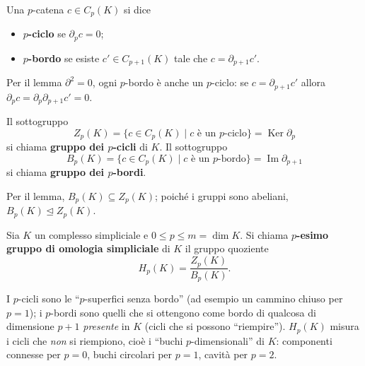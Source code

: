 \begin{definicion}
Una $p$-catena $c \in C_p(K)$ si dice
\begin{itemize}
    \item \textbf{$p$-ciclo} se $\partial_p c = 0$;
    \item \textbf{$p$-bordo} se esiste $c' \in C_{p+1}(K)$ tale che $c = \partial_{p+1} c'$.
\end{itemize}
\end{definicion}

\begin{observacion}
Per il lemma $\partial^2 = 0$, ogni $p$-bordo \`e anche un $p$-ciclo: se $c = \partial_{p+1} c'$ allora $\partial_p c = \partial_p \partial_{p+1} c' = 0$.
\end{observacion}

\begin{definicion}
Il sottogruppo
\[
Z_p(K) = \{ c \in C_p(K) \mid c \text{ \`e un $p$-ciclo} \} = \operatorname{Ker} \partial_p
\]
si chiama \textbf{gruppo dei $p$-cicli} di $K$. Il sottogruppo
\[
B_p(K) = \{ c \in C_p(K) \mid c \text{ \`e un $p$-bordo} \} = \operatorname{Im} \partial_{p+1}
\]
si chiama \textbf{gruppo dei $p$-bordi}.
\end{definicion}

\begin{observacion}
Per il lemma, $B_p(K) \subseteq Z_p(K)$; poich\'e i gruppi sono abeliani, $B_p(K) \trianglelefteq Z_p(K)$.
\end{observacion}

\begin{definicion}
Sia $K$ un complesso simpliciale e $0 \leqslant p \leqslant m = \dim K$. Si chiama \textbf{$p$-esimo gruppo di omologia simpliciale} di $K$ il gruppo quoziente
\[
H_p(K) = \frac{Z_p(K)}{B_p(K)} .
\]
\end{definicion}

\begin{intuizione}
I $p$-cicli sono le ``$p$-superfici senza bordo'' (ad esempio un cammino chiuso per $p=1$); i $p$-bordi sono quelli che si ottengono come bordo di qualcosa di dimensione $p+1$ \emph{presente} in $K$ (cicli che si possono ``riempire''). $H_p(K)$ misura i cicli che \emph{non} si riempiono, cio\`e i ``buchi $p$-dimensionali'' di $K$: componenti connesse per $p=0$, buchi circolari per $p=1$, cavit\`a per $p=2$.
\end{intuizione}

